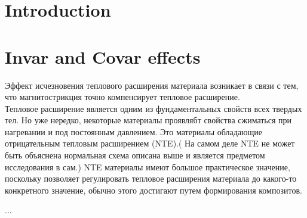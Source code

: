 \documentclass[12pt, a4paper, twocolumn]{article}
\begin{document}
\section{Introduction }


\section{Invar and Covar effects}
Эффект исчезновения теплового расширения материала возникает в связи с тем, что магнитострикция точно компенсирует тепловое расширение.\\ 

Тепловое расширение является одним из фундаментальных свойств всех твердых тел.
Но уже нередко, некоторые материалы проявлябт свойства сжиматься  при нагревании и под постоянным давлением. Это материалы обладающие отрицательным  тепловым расширением (NTE).( На самом деле NTE не может быть объяснена нормальная схема описана выше и является предметом исследования в сам.) NTE материалы  имеют большое практическое значение, поскольку позволяет
регулировать  тепловое расширения материала до
какого-то конкретного значение, обычно этого достигают  путем формирования композитов.

...


\nocite{*}


\end{document}
